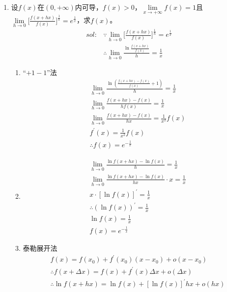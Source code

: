 \begin{enumerate}[{例}1.]
    \item 设$f(x)$在$(0,+\infty)$内可导，$f(x)>0$，$\lim\limits_{x\to{+\infty}}f(x)=1$且$\lim\limits_{h\to0}\bigg[\frac{f(x+hx)}{f(x)}\bigg]^\frac{1}{h}=e^\frac{1}{x}$，求$f(x)$。
        \begin{align*}
            sol:&\because \lim_{h \to 0}\bigg[\frac{f(x+hx)}{f(x)}\bigg]^{\frac{1}{h}}=e^{\frac{1}{x}}\\
            &\therefore \lim_{h \to 0}\frac{\ln \frac{f(x+hx)}{f(x)}}{h}=\frac{1}{x}
        \end{align*}
        \begin{enumerate}[$1^\circ$]
            \item ``$+1-1$''法
                \begin{align*}
                    &\lim_{h \to 0}\frac{\ln(\frac{f(x+hx)-f(x)}{f(x)}+1)}{h}=\frac{1}{x}\\
                    &\lim_{h \to 0}\frac{f(x+hx)-f(x)}{hf(x)}=\frac{1}{x}\\
                    &\lim_{h \to 0}\frac{f(x+hx)-f(x)}{hx}=\frac{1}{x^2}f(x)\\
                    &f^{\prime}(x)=\frac{1}{x^2}f(x)\\
                    &\therefore f(x)=e^{-\frac{1}{x}}
                \end{align*}
            \item 
                \begin{align*}
                    &\lim_{h \to 0} \frac{\ln f(x+hx)-\ln f(x)}{h}=\frac{1}{x}\\
                    &\lim_{h \to 0} \frac{\ln f(x+hx)-\ln f(x)}{hx}\cdot x=\frac{1}{x}\\
                    &x\cdot[\ln f(x)]^{\prime}=\frac{1}{x}\\
                    &\therefore (\ln f(x))^{\prime}=\frac{1}{x}\\
                    &\ln f(x)=\frac{1}{x}\\
                    &f(x)=e^{-\frac{1}{x}}
                \end{align*}
            \item 泰勒展开法
                \begin{align*}
                    &f(x)=f(x_0)+f^{\prime}(x_0)(x-x_0)+o(x-x_0)\\
                    &\therefore f(x+\Delta x)=f(x)+f^{\prime}(x)\Delta x+o(\Delta x)\\
                    &\therefore \ln f(x+hx)=\ln f(x)+[\ln f(x)]^{\prime}hx+o(hx)\\

\end{align*}
\end{enumerate}
\end{enumerate}
